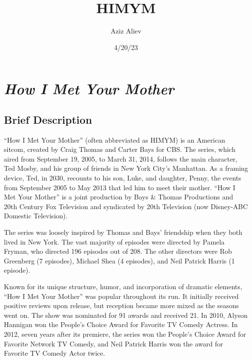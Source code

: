 \documentclass[
  letterpaper,
  DIV=11,
  numbers=noendperiod]{scrartcl}
\title{HIMYM}
\author{Aziz Aliev}
\date{4/20/23}
\begin{document}
\maketitle
\ifdefined\Shaded\renewenvironment{Shaded}{\begin{tcolorbox}[breakable, borderline west={3pt}{0pt}{shadecolor}, interior hidden, frame hidden, enhanced, sharp corners, boxrule=0pt]}{\end{tcolorbox}}\fi

\listoffigures
\listoftables
\hypertarget{how-i-met-your-mother}{%
\section{\texorpdfstring{\emph{How I Met Your
Mother}}{How I Met Your Mother}}\label{how-i-met-your-mother}}

\hypertarget{brief-description}{%
\subsection{Brief Description}\label{brief-description}}

``How I Met Your Mother'' (often abbreviated as HIMYM) is an American
sitcom, created by Craig Thomas and Carter Bays for CBS. The series,
which aired from September 19, 2005, to March 31, 2014, follows the main
character, Ted Mosby, and his group of friends in New York City's
Manhattan. As a framing device, Ted, in 2030, recounts to his son, Luke,
and daughter, Penny, the events from September 2005 to May 2013 that led
him to meet their mother. ``How I Met Your Mother'' is a joint
production by Bays \& Thomas Productions and 20th Century Fox Television
and syndicated by 20th Television (now Disney-ABC Domestic Television).

The series was loosely inspired by Thomas and Bays' friendship when they
both lived in New York. The vast majority of episodes were directed by
Pamela Fryman, who directed 196 episodes out of 208. The other directors
were Rob Greenberg (7 episodes), Michael Shea (4 episodes), and Neil
Patrick Harris (1 episode).

Known for its unique structure, humor, and incorporation of dramatic
elements, ``How I Met Your Mother'' was popular throughout its run. It
initially received positive reviews upon release, but reception became
more mixed as the seasons went on. The show was nominated for 91 awards
and received 21. In 2010, Alyson Hannigan won the People's Choice Award
for Favorite TV Comedy Actress. In 2012, seven years after its premiere,
the series won the People's Choice Award for Favorite Network TV Comedy,
and Neil Patrick Harris won the award for Favorite TV Comedy Actor
twice.
\end{document}
